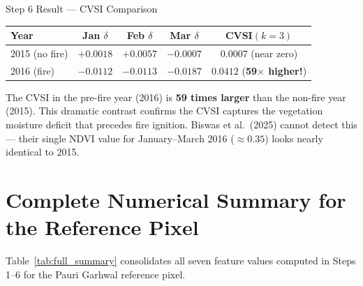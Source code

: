 \documentclass[12pt, a4paper]{article}
\begin{document}
\begin{resultbox}{Step 6 Result --- CVSI Comparison}
\begin{center}
\begin{tabular}{lcccc}
\toprule
\textbf{Year} & \textbf{Jan $\delta$} & \textbf{Feb $\delta$} &
\textbf{Mar $\delta$} & \textbf{CVSI$(k=3)$} \\
\midrule
2015 (no fire) &
  $+0.0018$ & $+0.0057$ & $-0.0007$ &
  $\mathbf{0.0007}$ \quad (near zero) \\
2016 (fire) &
  $-0.0112$ & $-0.0113$ & $-0.0187$ &
  $\mathbf{0.0412}$ \quad (\textbf{59$\times$ higher!}) \\
\bottomrule
\end{tabular}
\end{center}

\medskip
The CVSI in the pre-fire year (2016) is \textbf{59 times larger} than
the non-fire year (2015). This dramatic contrast confirms the CVSI
captures the vegetation moisture deficit that precedes fire ignition.
Biswas et al.\ (2025) cannot detect this --- their single NDVI value
for January--March 2016 ($\approx 0.35$) looks nearly identical to 2015.
\end{resultbox}

\section{Complete Numerical Summary for the Reference Pixel}
\label{sec:summary}

Table~\ref{tab:full_summary} consolidates all seven feature values
computed in Steps 1--6 for the Pauri Garhwal reference pixel.
\end{document}
